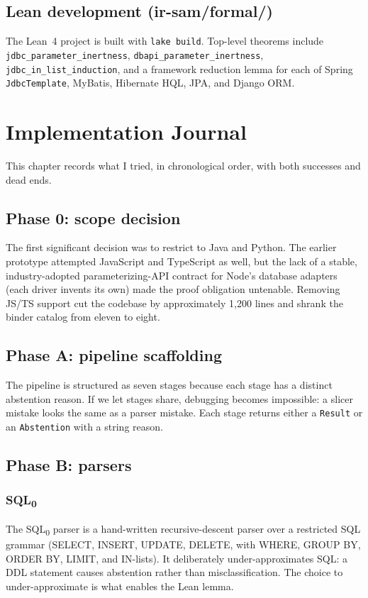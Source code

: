 \documentclass[a4paper,11pt]{report}
\begin{document}
\section{Lean development (ir-sam/formal/)}
The Lean~4 project is built with \texttt{lake build}. Top-level theorems include \texttt{jdbc\_parameter\_inertness}, \texttt{dbapi\_parameter\_inertness}, \texttt{jdbc\_in\_list\_induction}, and a framework reduction lemma for each of Spring \texttt{JdbcTemplate}, MyBatis, Hibernate HQL, JPA, and Django ORM.

\chapter{Implementation Journal}\label{ch:journal}
This chapter records what I tried, in chronological order, with both successes and dead ends.

\section{Phase 0: scope decision}
The first significant decision was to restrict to Java and Python. The earlier prototype attempted JavaScript and TypeScript as well, but the lack of a stable, industry-adopted parameterizing-API contract for Node's database adapters (each driver invents its own) made the proof obligation untenable. Removing JS/TS support cut the codebase by approximately 1{,}200 lines and shrank the binder catalog from eleven to eight.

\section{Phase A: pipeline scaffolding}
The pipeline is structured as seven stages because each stage has a distinct abstention reason. If we let stages share, debugging becomes impossible: a slicer mistake looks the same as a parser mistake. Each stage returns either a \texttt{Result} or an \texttt{Abstention} with a string reason.

\section{Phase B: parsers}
\subsection{SQL\textsubscript{0}}
The SQL\textsubscript{0} parser is a hand-written recursive-descent parser over a restricted SQL grammar (SELECT, INSERT, UPDATE, DELETE, with WHERE, GROUP BY, ORDER BY, LIMIT, and IN-lists). It deliberately under-approximates SQL: a DDL statement causes abstention rather than misclassification. The choice to under-approximate is what enables the Lean lemma.
\end{document}
